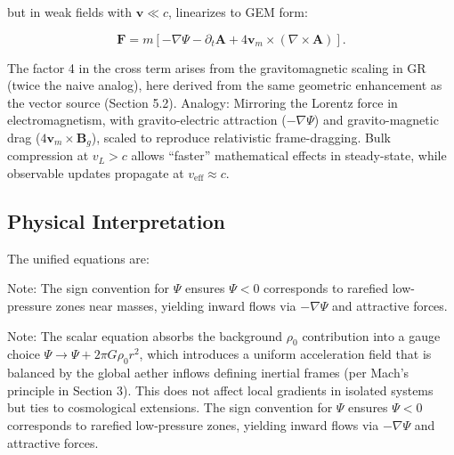 \documentclass{article}
\begin{document}
but in weak fields with $\mathbf{v} \ll c$, linearizes to GEM form:

\[
\mathbf{F} = m \left[ -\nabla \Psi - \partial_t \mathbf{A} + 4 \mathbf{v}_m \times (\nabla \times \mathbf{A}) \right].
\]

The factor 4 in the cross term arises from the gravitomagnetic scaling in GR (twice the naive analog), here derived from the same geometric enhancement as the vector source (Section 5.2). Analogy: Mirroring the Lorentz force in electromagnetism, with gravito-electric attraction ($-\nabla \Psi$) and gravito-magnetic drag ($4 \mathbf{v}_m \times \mathbf{B}_g$), scaled to reproduce relativistic frame-dragging. Bulk compression at $v_L > c$ allows ``faster'' mathematical effects in steady-state, while observable updates propagate at $v_{\text{eff}} \approx c$.

\subsection{Physical Interpretation}

The unified equations are:





Note: The sign convention for $\Psi$ ensures $\Psi < 0$ corresponds to rarefied low-pressure zones near masses, yielding inward flows via $-\nabla \Psi$ and attractive forces.

Note: The scalar equation absorbs the background $\rho_0$ contribution into a gauge choice $\Psi \to \Psi + 2\pi G \rho_0 r^2$, which introduces a uniform acceleration field that is balanced by the global aether inflows defining inertial frames (per Mach's principle in Section 3). This does not affect local gradients in isolated systems but ties to cosmological extensions. The sign convention for $\Psi$ ensures $\Psi < 0$ corresponds to rarefied low-pressure zones, yielding inward flows via $-\nabla \Psi$ and attractive forces.
\end{document}
